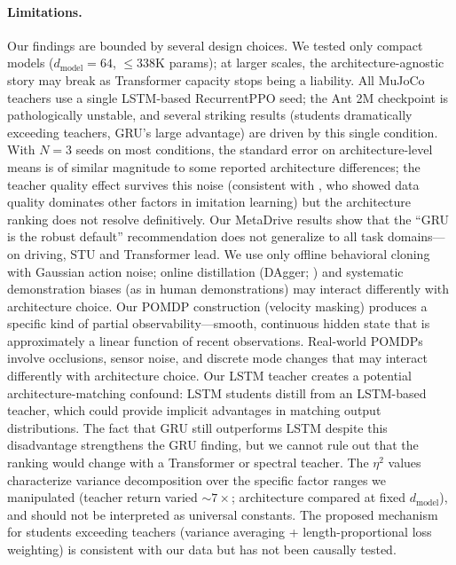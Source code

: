\paragraph{Limitations.}
Our findings are bounded by several design choices.
We tested only compact models ($d_\text{model}{=}64$, ${\leq}338$K params); at larger scales, the architecture-agnostic story may break as Transformer capacity stops being a liability.
All MuJoCo teachers use a single LSTM-based RecurrentPPO seed; the Ant 2M checkpoint is pathologically unstable, and several striking results (students dramatically exceeding teachers, GRU's large advantage) are driven by this single condition.
With $N{=}3$ seeds on most conditions, the standard error on architecture-level means is of similar magnitude to some reported architecture differences; the teacher quality effect survives this noise (consistent with \citet{belkhale2023data}, who showed data quality dominates other factors in imitation learning) but the architecture ranking does not resolve definitively.
Our MetaDrive results show that the ``GRU is the robust default'' recommendation does not generalize to all task domains---on driving, STU and Transformer lead.
We use only offline behavioral cloning with Gaussian action noise; online distillation (DAgger; \citet{ross2011dagger}) and systematic demonstration biases (as in human demonstrations) may interact differently with architecture choice.
Our POMDP construction (velocity masking) produces a specific kind of partial observability---smooth, continuous hidden state that is approximately a linear function of recent observations. Real-world POMDPs involve occlusions, sensor noise, and discrete mode changes that may interact differently with architecture choice.
Our LSTM teacher creates a potential architecture-matching confound: LSTM students distill from an LSTM-based teacher, which could provide implicit advantages in matching output distributions. The fact that GRU still outperforms LSTM despite this disadvantage strengthens the GRU finding, but we cannot rule out that the ranking would change with a Transformer or spectral teacher.
The $\eta^2$ values characterize variance decomposition over the specific factor ranges we manipulated (teacher return varied ${\sim}7\times$; architecture compared at fixed $d_\text{model}$), and should not be interpreted as universal constants.
The proposed mechanism for students exceeding teachers (variance averaging + length-proportional loss weighting) is consistent with our data but has not been causally tested.

